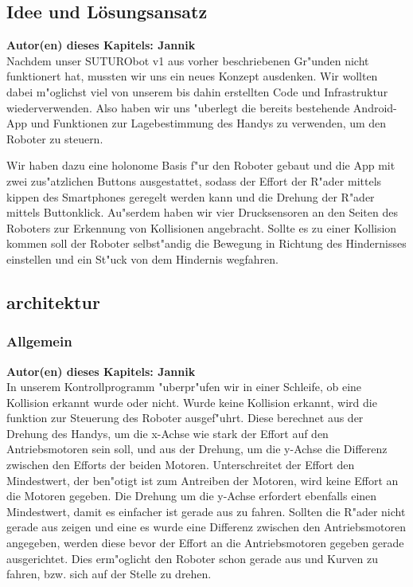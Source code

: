 \documentclass[8pt]{article}
\newcommand{\secauthor}[1]{\textbf{Autor(en) dieses Kapitels: {#1}}\\}
\begin{document}
\subsection{Idee und Lösungsansatz} 
\secauthor{Jannik}
Nachdem unser SUTURObot v1 aus vorher beschriebenen Gr"unden nicht funktionert hat, mussten wir uns ein neues Konzept ausdenken. Wir wollten dabei m"oglichst viel von unserem bis dahin erstellten Code und Infrastruktur wiederverwenden. Also haben wir uns "uberlegt die bereits bestehende Android-App und Funktionen zur Lagebestimmung des Handys zu verwenden, um den Roboter zu steuern.

Wir haben dazu eine holonome Basis f"ur den Roboter gebaut und die App mit zwei zus"atzlichen Buttons ausgestattet, sodass der Effort der R"ader mittels kippen des Smartphones geregelt werden kann und die Drehung der R"ader mittels Buttonklick. Au"serdem haben wir vier Drucksensoren an den Seiten des Roboters zur Erkennung von Kollisionen angebracht. Sollte es zu einer Kollision kommen soll der Roboter selbst"andig die Bewegung in Richtung des Hindernisses einstellen und ein St"uck von dem Hindernis wegfahren.

\subsection{architektur}

\subsubsection{Allgemein}
\secauthor{Jannik}
In unserem Kontrollprogramm "uberpr"ufen wir in einer Schleife, ob eine Kollision erkannt wurde oder nicht. Wurde keine Kollision erkannt, wird die funktion zur Steuerung des Roboter ausgef"uhrt. Diese berechnet aus der Drehung des Handys, um die x-Achse wie stark der Effort auf den Antriebsmotoren sein soll, und aus der Drehung, um die y-Achse die Differenz zwischen den Efforts der beiden Motoren. Unterschreitet der Effort den Mindestwert, der ben"otigt ist zum Antreiben der Motoren, wird keine Effort an die Motoren gegeben. Die Drehung um die y-Achse erfordert ebenfalls einen Mindestwert, damit es einfacher ist gerade aus zu fahren. Sollten die R"ader nicht gerade aus zeigen und eine es wurde eine Differenz zwischen den Antriebsmotoren angegeben, werden diese bevor der Effort an die Antriebsmotoren gegeben gerade ausgerichtet. Dies erm"oglicht den Roboter schon gerade aus und Kurven zu fahren, bzw. sich auf der Stelle zu drehen.
\end{document}
